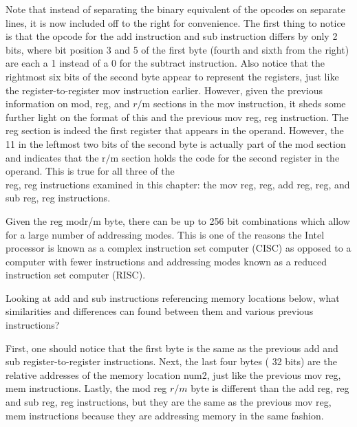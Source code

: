 \documentclass[10pt]{book}
\begin{document}
Note that instead of separating the binary equivalent of the opcodes on separate lines, it is now included off to the right for convenience. The first thing to notice is that the opcode for the add instruction and sub instruction differs by only 2 bits, where bit position 3 and 5 of the first byte (fourth and sixth from the right) are each a 1 instead of a 0 for the subtract instruction. Also notice that the rightmost six bits of the second byte appear to represent the registers, just like the register-to-register mov instruction earlier. However, given the previous information on mod, reg, and $r / \mathrm{m}$ sections in the mov instruction, it sheds some further light on the format of this and the previous mov reg, reg instruction. The reg section is indeed the first register that appears in the operand. However, the 11 in the leftmost two bits of the second byte is actually part of the mod section and indicates that the $\mathrm{r} / \mathrm{m}$ section holds the code for the second register in the operand. This is true for all three of the\\
reg, reg instructions examined in this chapter: the mov reg, reg, add reg, reg, and sub reg, reg instructions.


Given the reg modr/m byte, there can be up to 256 bit combinations which allow for a large number of addressing modes. This is one of the reasons the Intel processor is known as a complex instruction set computer (CISC) as opposed to a computer with fewer instructions and addressing modes known as a reduced instruction set computer (RISC).

Looking at add and sub instructions referencing memory locations below, what similarities and differences can found between them and various previous instructions?

First, one should notice that the first byte is the same as the previous add and sub register-to-register instructions. Next, the last four bytes ( 32 bits) are the relative addresses of the memory location num2, just like the previous mov reg, mem instructions. Lastly, the mod reg $r / m$ byte is different than the add reg, reg and sub reg, reg instructions, but they are the same as the previous mov reg, mem instructions because they are addressing memory in the same fashion.
\end{document}

